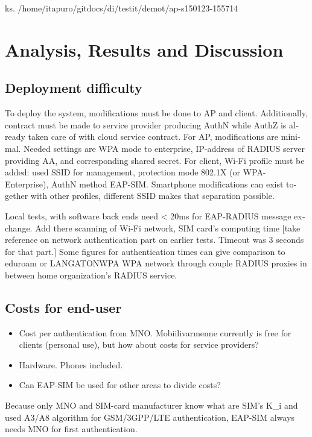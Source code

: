 \documentclass[12pt,a4paper,english]{tutthesis}
\begin{document}
\begin{otherlanguage}{english}
ks. /home/itapuro/gitdocs/di/testit/demot/ap-s150123-155714


\chapter{Analysis, Results and Discussion}
\label{sec-6}


\section{Deployment difficulty}
\label{sec-6-1}

To deploy the system, modifications must be done to AP and client.
Additionally, contract must be made to service
provider producing AuthN while AuthZ is already taken care of with cloud service contract.
For AP, modifications are minimal. Needed settings are
WPA mode to enterprise, IP-address of RADIUS server providing 
AA, and corresponding shared secret.
For client, Wi-Fi profile must be added: used SSID for management,
protection mode 802.1X (or WPA-Enterprise), AuthN method EAP-SIM.
Smartphone modifications can exist together with other
profiles, different SSID makes that separation possible.

Local tests, with software back ends need < 20ms for EAP-RADIUS message
exchange. 
Add there scanning of Wi-Fi network, SIM card's computing
time [take reference on network authentication part on earlier
tests. Timeout was 3 seconds for that part.]
Some figures for authentication times can give comparison to eduroam
or LANGATONWPA WPA network through couple RADIUS proxies in between home
organization's RADIUS service.

\section{Costs for end-user}
\label{sec-6-2}
\begin{itemize}
\item Cost per authentication from MNO. Mobiilivarmenne
currently is free for clients (personal use), but how about costs
for  service providers?
\item Hardware. Phones included.
\item Can EAP-SIM be used for other areas to divide costs?
\end{itemize}

Because only MNO and SIM-card manufacturer know 
what are SIM's K\_i and used A3/A8 algorithm
for GSM/3GPP/LTE authentication,
EAP-SIM always needs MNO for first authentication.



\end{otherlanguage}
\end{document}
